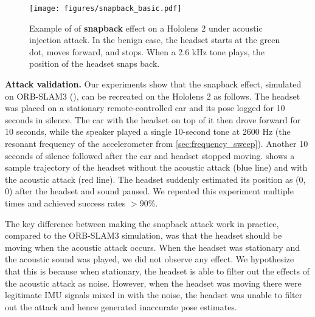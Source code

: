 \begin{figure}[h]
    \centering
    \texttt{[image: figures/snapback\_basic.pdf]}
    \caption{Example of of \textbf{snapback} effect on a Hololens 2 under acoustic injection attack. In the benign case, the headset starts at the green dot, moves forward, and stops. When a 2.6 kHz tone plays, the position of the headset snaps back.}
    \label{fig:holo_acc_basic}
\end{figure}


\textbf{Attack validation.}
Our experiments show that the snapback effect, simulated on ORB-SLAM3  (), can be recreated on the Hololens 2 as follows.
The headset was placed on a stationary remote-controlled car and its pose logged for 10 seconds in silence.
The car with the headset on top of it then drove forward for 10 seconds, while the speaker played a single 10-second tone at 2600 Hz (the resonant frequency of the accelerometer from \ref{sec:frequency_sweep}). Another 10 seconds of silence followed after the car and headset stopped moving.
 shows a sample trajectory of the headset without the acoustic attack (blue line) and with the acoustic attack (red line).
The headset suddenly estimated its position as (0, 0) after the headset and sound paused.
We repeated this experiment multiple times and achieved success rates $>90\%$.

The key difference between making the snapback attack work in practice, compared to the ORB-SLAM3 simulation, was that the headset should be moving when the acoustic attack occurs.
When the headset was stationary and the acoustic sound was played, we did not observe any effect.
We hypothesize that this is because when stationary, the headset is able to filter out the effects of the acoustic attack as noise. However, when the headset was moving there were legitimate IMU signals mixed in with the noise, the headset was unable to filter out the attack and hence generated inaccurate pose estimates.

